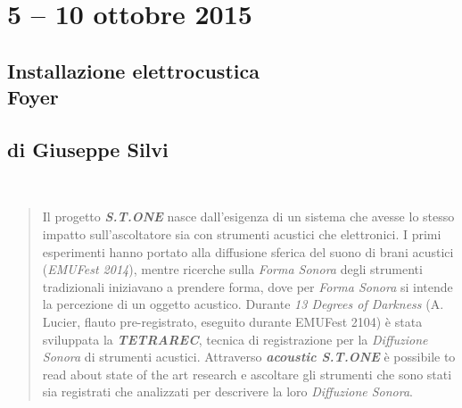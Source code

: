 \documentclass[8pt, twoside, a5paper]{extreport}
\newcommand\blankpage{%
    \null
    \thispagestyle{empty}%
    \addtocounter{page}{-1}%
    \newpage}
\begin{document}
\bigskip

\vspace{3mm}

\begin{multicols}{2}




\end{multicols}

\clearpage





\section*{5 -- 10 ottobre 2015}

\subsection*{{\small Installazione elettrocustica} \\
	\textsf{Foyer}}

{\fontsize{30}{30} }

\subsection*{\textsf{di Giuseppe Silvi}}

\begin{center}
\fontsize{25}{25}  \\
\end{center}


\begin{quote}

{\svolk \small
Il progetto \emph{\textbf{S.T.ONE}} nasce dall'esigenza di un sistema che avesse lo stesso impatto sull'ascoltatore sia con strumenti acustici che elettronici. I primi esperimenti hanno portato alla diffusione sferica del suono di brani acustici (\emph{EMUFest 2014}), mentre ricerche sulla \emph{Forma Sonora} degli strumenti tradizionali iniziavano a prendere forma, dove per \emph{Forma Sonora} si intende la percezione di un oggetto acustico. Durante \emph{13 Degrees of Darkness} (A. Lucier, flauto pre-registrato, eseguito durante EMUFest 2104)  è stata sviluppata la \emph{\textbf{TETRAREC}}, tecnica di registrazione per la \emph{Diffuzione Sonora} di strumenti acustici.
Attraverso \emph{\textbf{acoustic S.T.ONE}} è possibile to read about state of the art research e ascoltare gli strumenti che sono stati sia registrati che analizzati per descrivere la loro \emph{Diffuzione Sonora}.}

\end{quote}    
\end{document}
